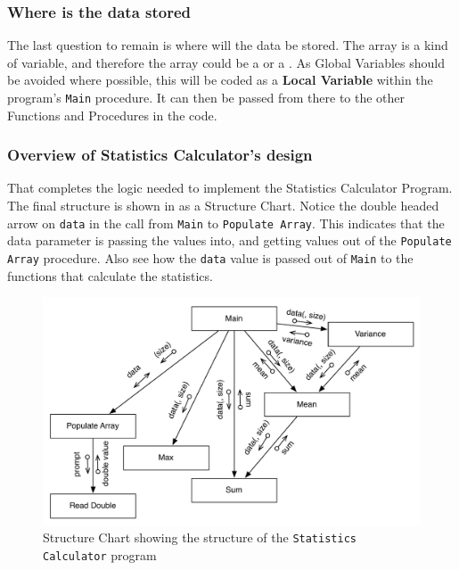 

\subsubsection{Where is the data stored} %
\label{ssub:where_is_the_data_stored}

The last question to remain is where will the data be stored. The array is a kind of variable, and therefore the array could be a  or a . As Global Variables should be avoided where possible, this will be coded as a \textbf{Local Variable} within the program's \texttt{Main} procedure. It can then be passed from there to the other Functions and Procedures in the code.


\clearpage
\subsubsection{Overview of Statistics Calculator's design} %
\label{ssub:overview_of_statistics_calculators_design}

That completes the logic needed to implement the Statistics Calculator Program. The final structure is shown in  as a Structure Chart. Notice the double headed arrow on \texttt{data} in the call from \texttt{Main} to \texttt{Populate Array}. This indicates that the data parameter is passing the values into, and getting values out of the \texttt{Populate Array} procedure. Also see how the \texttt{data} value is passed out of \texttt{Main} to the functions that calculate the statistics.

\begin{figure}[htbp]
   \centering
   \includegraphics[width=\textwidth]{./topics/arrays/diagrams/StatsCalcStruct} 
   \caption{Structure Chart showing the structure of the \texttt{Statistics Calculator} program}
   \label{fig:stats-calc-struct}
\end{figure}

